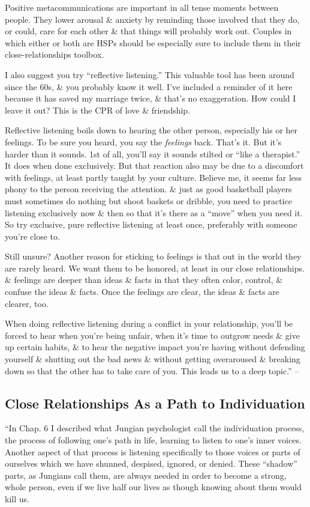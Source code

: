 \documentclass{article}
\numberwithin{equation}{section}
\begin{document}
Positive metacommunications are important in all tense moments between people. They lower arousal \& anxiety by reminding those involved that they do, or could, care for each other \& that things will probably work out. Couples in which either or both are HSPs should be especially sure to include them in their close-relationships toolbox.

I also suggest you try ``reflective listening.'' This valuable tool has been around since the 60s, \& you probably know it well. I've included a reminder of it here because it has saved my marriage twice, \& that's no exaggeration. How could I leave it out? This is the CPR of love \& friendship.

Reflective listening boils down to hearing the other person, especially his or her feelings. To be sure you heard, you say the \textit{feelings} back. That's it. But it's harder than it sounds. 1st of all, you'll say it sounds stilted or ``like a therapist.'' It does when done exclusively. But that reaction also may be due to a discomfort with feelings, at least partly taught by your culture. Believe me, it seems far less phony to the person receiving the attention. \& just as good basketball players must sometimes do nothing but shoot baskets or dribble, you need to practice listening exclusively now \& then so that it's there as a ``move'' when you need it. So try exclusive, pure reflective listening at least once, preferably with someone you're close to.

Still unsure? Another reason for sticking to feelings is that out in the world they are rarely heard. We want them to be honored, at least in our close relationships. \& feelings are deeper than ideas \& facts in that they often color, control, \& confuse the ideas \& facts. Once the feelings are clear, the ideas \& facts are clearer, too.

When doing reflective listening during a conflict in your relationship, you'll be forced to hear when you're being unfair, when it's time to outgrow needs \& give up certain habits, \& to hear the negative impact you're having without defending yourself \& shutting out the bad news \& without getting overaroused \& breaking down so that the other has to take care of you. This leads us to a deep topic.'' -- \cite[pp. 189--190]{Aron2013}

\subsection{Close Relationships As a Path to Individuation}
``In Chap. 6 I described what Jungian psychologist call the individuation process, the process of following one's path in life, learning to listen to one's inner voices. Another aspect of that process is listening specifically to those voices or parts of ourselves which we have shunned, despised, ignored, or denied. These ``shadow'' parts, as Jungians call them, are always needed in order to become a strong, whole person, even if we live half our lives as though knowing about them would kill us.
\end{document}
